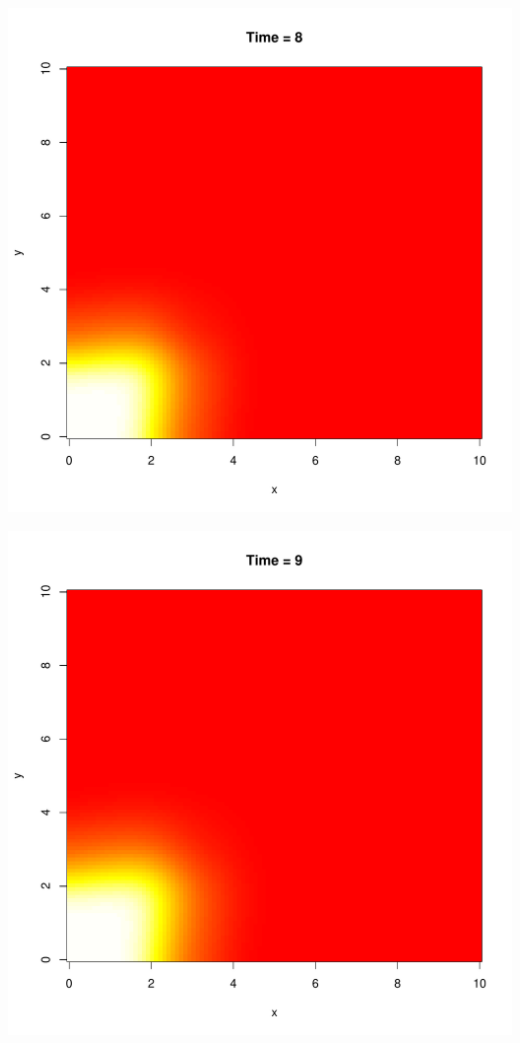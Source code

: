 \documentclass{tufte-handout}\usepackage[]{graphicx}\usepackage[]{xcolor}
\makeatletter
\def\maxwidth{ %
  \ifdim\Gin@nat@width>\linewidth
    \linewidth
  \else
    \Gin@nat@width
  \fi
}
\newenvironment{knitrout}{}{} %
\makeatother
\begin{document}
\begin{knitrout}
\includegraphics[width=\maxwidth]{figure/unnamed-chunk-4-9} 

\includegraphics[width=\maxwidth]{figure/unnamed-chunk-4-10} 


\end{knitrout}
\end{document}
